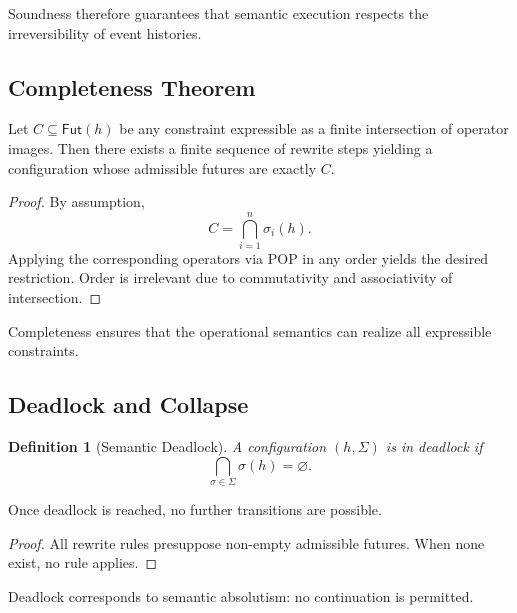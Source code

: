 \documentclass[11pt]{article}
\newtheorem{definition}{Definition}
\begin{document}
Soundness therefore guarantees that semantic execution respects the
irreversibility of event histories.


\subsection{Completeness Theorem}

\begin{theorem}[Completeness]
Let $C \subseteq \mathsf{Fut}(h)$ be any constraint expressible as a finite
intersection of operator images. Then there exists a finite sequence of rewrite
steps yielding a configuration whose admissible futures are exactly $C$.
\end{theorem}

\begin{proof}
By assumption,
\[
C = \bigcap_{i=1}^n \sigma_i(h).
\]
Applying the corresponding operators via POP in any order yields the desired
restriction. Order is irrelevant due to commutativity and associativity of
intersection.
\end{proof}

Completeness ensures that the operational semantics can realize all expressible
constraints.

\subsection{Deadlock and Collapse}

\begin{definition}[Semantic Deadlock]
A configuration $(h, \Sigma)$ is in deadlock if
\[
\bigcap_{\sigma \in \Sigma} \sigma(h) = \varnothing.
\]
\end{definition}

\begin{lemma}
Once deadlock is reached, no further transitions are possible.
\end{lemma}

\begin{proof}
All rewrite rules presuppose non-empty admissible futures. When none exist, no
rule applies.
\end{proof}

Deadlock corresponds to semantic absolutism: no continuation is permitted.

\end{document}
